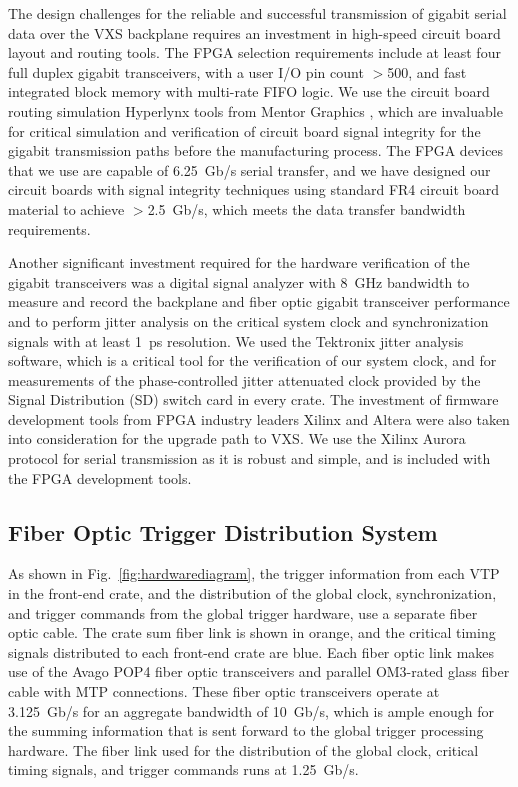 The design challenges for the reliable and successful transmission of gigabit serial data over the VXS backplane requires
an investment in high-speed circuit board layout and routing tools.  The FPGA selection requirements include at least
four full duplex gigabit transceivers, with a user I/O pin count $>$500, and fast integrated block memory with multi-rate
FIFO logic. We use the circuit board routing simulation Hyperlynx tools from Mentor Graphics \cite{hyperlynx-ref},
which are invaluable for critical simulation and verification of circuit board signal integrity for the gigabit transmission
paths before the manufacturing process.  The FPGA devices that we use are capable of 6.25~Gb/s serial transfer, and
we have designed our circuit boards with signal integrity techniques using standard FR4 circuit board material to achieve
$>$2.5~Gb/s, which meets the data transfer bandwidth requirements. 

Another significant investment required for the hardware verification of the gigabit transceivers was a digital signal
analyzer with 8~GHz bandwidth to measure and record the backplane and fiber optic gigabit transceiver performance
and to perform jitter analysis on the critical system clock and synchronization signals with at least 1~ps resolution. We
used the Tektronix jitter analysis software, which is a critical tool for the verification of our system clock, and for
measurements of the phase-controlled jitter attenuated clock provided by the Signal Distribution (SD) switch card in
every crate. The investment of firmware development tools from FPGA industry leaders Xilinx and Altera were also
taken into consideration for the upgrade path to VXS. We use the Xilinx Aurora protocol for serial transmission as it is
robust and simple, and is included with the FPGA development tools.  

\subsection{Fiber Optic Trigger Distribution System}

As shown in Fig.~\ref{fig:hardwarediagram}, the trigger information from each VTP in the front-end crate, and the
distribution of the global clock, synchronization, and trigger commands from the global trigger hardware, use a separate
fiber optic cable.  The crate sum fiber link is shown in orange, and the critical timing signals distributed to each front-end
crate are blue.  Each fiber optic link makes use of the Avago POP4 fiber optic transceivers and parallel OM3-rated glass
fiber cable with MTP connections. These fiber optic transceivers operate at 3.125~Gb/s for an aggregate bandwidth of
10~Gb/s, which is ample enough for the summing information that is sent forward to the global trigger processing hardware.
The fiber link used for the distribution of the global clock, critical timing signals, and trigger commands runs at 1.25~Gb/s.

